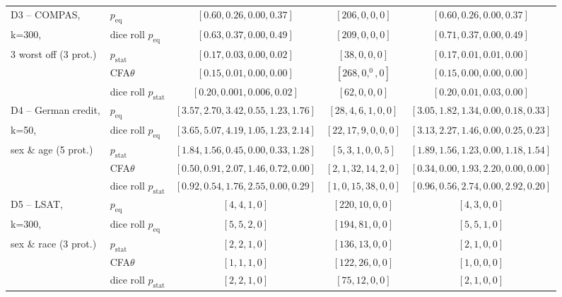 \begin{table}[t!]
{\begin{tabular}{llccc}
			\midrule
			\midrule
			D3 -- COMPAS, 			& \algoFAIR  $p_{\text{eq}}$ 	& $[0.60, 0.26, 0.00, 0.37]$ 	& $[206, 0, 0, 0]$ 		& $[0.60, 0.26, 0.00, 0.37]$ \\
			k=300,					& dice roll $p_{\text{eq}}$ 	& $[0.63, 0.37, 0.00, 0.49]$ & $[209, 0, 0, 0]$ 	& $[0.71, 0.37, 0.00, 0.49]$ \\
									\cline{2-5}
			3 worst off (3 prot.)	& \algoFAIR  $p_{\text{stat}}$ 	& $[0.17, 0.03, 0.00, 0.02]$ 	& $[38, 0,0,0]$ 				& $[0.17, 0.01,0.01, 0.00] $  \\
								 	& CFA$\theta$ 					& $[0.15, 0.01, 0.00, 0.00] $ & $[268, 0, ^0, 0]$ 	& $[0.15, 0.00, 0.00, 0.00]$   \\
									& dice roll $p_{\text{stat}}$ 	& $[0.20, 0.001, 0.006, 0.02]$ & $[62, 0, 0, 0]$ 		& $[0.20, 0.01, 0.03, 0.00]$ \\

			\midrule
			\midrule
			D4 -- German credit, 	& \algoFAIR $p_{\text{eq}}$ 	&  $[3.57, 2.70, 3.42, 0.55, 1.23, 1.76]$ 	& $[28, 4, 6, 1, 0, 0]$ 	& $[3.05, 1.82, 1.34, 0.00, 0.18, 0.33]$ \\
			k=50,					& dice roll $p_{\text{eq}}$ 	& $[3.65, 5.07, 4.19, 1.05, 1.23, 2.14]$ & $[22, 17, 9, 0, 0, 0]$ 	& $[3.13, 2.27, 1.46, 0.00, 0.25, 0.23]$ \\
									\cline{2-5}
			sex \& age (5 prot.) 	& \algoFAIR $p_{\text{stat}}$ & $[1.84, 1.56, 0.45, 0.00, 0.33, 1.28]$ & $[5, 3, 1, 0, 0, 5]$ & $[1.89, 1.56, 1.23, 0.00, 1.18, 1.54]$  \\
									& CFA$\theta$ &  $[0.50, 0.91, 2.07, 1.46, 0.72, 0.00]$ & $[2, 1, 32, 14, 2, 0]$ & $[0.34, 0.00, 1.93, 2.20, 0.00, 0.00]$ \\
									& dice roll $p_{\text{stat}}$ 	& $[0.92, 0.54, 1.76, 2.55, 0.00, 0.29]$ & $[1, 0, 15, 38, 0, 0]$ 		& $[0.96, 0.56, 2.74, 0.00, 2.92, 0.20]$ \\

			\midrule
			\midrule
			D5 -- LSAT, 			& \algoFAIR $p_{\text{eq}}$ 	& $[4, 4, 1, 0]$	& $[220, 10, 0, 0]$ & $[4, 3, 0, 0]$  \\
			k=300, 					& dice roll $p_{\text{eq}}$ 	& $[5, 5, 2, 0]$ & $[194, 81, 0, 0]$ 	& $[5, 5, 1, 0]$ \\
									\cline{2-5}
			sex \& race (3 prot.) 	& \algoFAIR $p_{\text{stat}}$ 	& $[2, 2, 1, 0]$ 	& $[136, 13, 0, 0]$ & $[2, 1, 0, 0]$  \\
									& CFA$\theta$ 					& $[1, 1, 1, 0]$ 	& $[122, 26, 0, 0]$ & $[1, 0, 0, 0]$  \\
									& dice roll $p_{\text{stat}}$ 	& $[2, 2, 1, 0]$ & $[75, 12, 0, 0]$ 	& $[2, 1, 0, 0]$ \\
			\bottomrule
		\end{tabular}
	}
\end{table}

